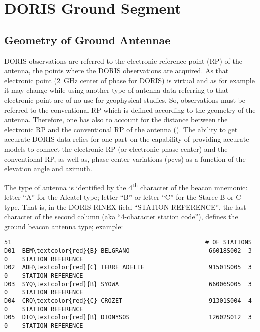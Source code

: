 \chapter{DORIS Ground Segment}
\label{ch:doris-ground-segment}

\section{Geometry of Ground Antennae}
DORIS observations are referred to the electronic reference point (RP) of the 
antenna, the points where the DORIS observations  are  acquired.  As that 
electronic  point (\SI{2}{\GHz} center of phase for DORIS) is virtual and as 
for example it may change while using another type of antenna data referring 
to that electronic point are of no use for geophysical studies. So, 
observations must be referred to the conventional RP which is defined 
according to the geometry of the antenna. Therefore, one has also to account 
for the distance between the electronic RP and the conventional RP of the 
antenna (\cite{TOURAIN2016}). The ability to get accurate DORIS data relies 
for one part on the capability of providing accurate models to connect the 
electronic RP (or electronic phase center) and the conventional RP, as well 
as, phase center variations (\glspl{pcv}) as a function of the elevation angle 
and azimuth.

The type of antenna is identified by the 4\textsuperscript{th} character of 
the beacon mnemonic: letter ``A'' for the Alcatel type; letter ``B'' or letter 
``C'' for the Starec B or C type.  That is, in the DORIS RINEX field 
``STATION REFERENCE'', the last character of the second column (aka 
``4-character station code''), defines the ground beacon antenna type; 
example:

\begin{adjustbox}{max width=\linewidth , fbox=0.5pt}
\begin{BVerbatim}[commandchars=\\\{\}]
    51                                                      # OF STATIONS       
D01  BEM\textcolor{red}{B} BELGRANO                      66018S002  3   0    STATION REFERENCE   
D02  ADH\textcolor{red}{C} TERRE ADELIE                  91501S005  3   0    STATION REFERENCE   
D03  SYQ\textcolor{red}{B} SYOWA                         66006S005  3   0    STATION REFERENCE   
D04  CRQ\textcolor{red}{C} CROZET                        91301S004  4   0    STATION REFERENCE   
D05  DIO\textcolor{red}{B} DIONYSOS                      12602S012  3   0    STATION REFERENCE
\end{BVerbatim}
\end{adjustbox}

